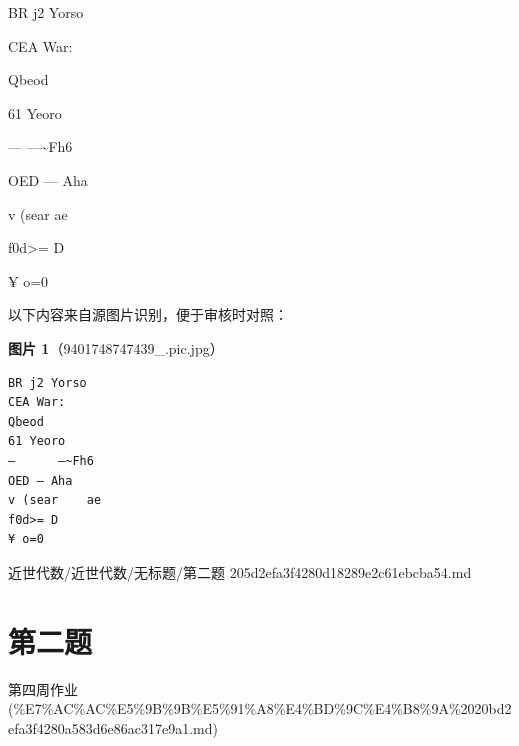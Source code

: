 \begin{homework}

BR j2 Yorso

CEA War:

Qbeod

61 Yeoro

—      —\textasciitilde{}Fh6

OED — Aha

v (sear    ae

f0d>= D

¥ o=0

\end{homework}

\begin{note}
以下内容来自源图片识别，便于审核时对照：

\textbf{图片 1}（9401748747439\_.pic.jpg）
\begin{Verbatim}[fontsize=\small]
BR j2 Yorso
CEA War:
Qbeod
61 Yeoro
—      —~Fh6
OED — Aha
v (sear    ae
f0d>= D
¥ o=0
\end{Verbatim}

\end{note}

\begin{note}[来源路径]

近世代数/近世代数/无标题/第二题 205d2efa3f4280d18289e2c61ebcba54.md

\end{note}

\section*{第二题}

\begin{note}[来源上级主题]

第四周作业 (\%E7\%AC\%AC\%E5\%9B\%9B\%E5\%91\%A8\%E4\%BD\%9C\%E4\%B8\%9A\%2020bd2efa3f4280a583d6e86ac317e9a1.md)

\end{note}

